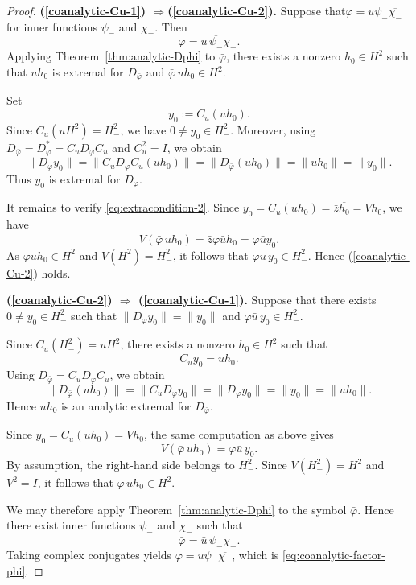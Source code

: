 \documentclass[12pt]{amsart}
\theoremstyle{definition}
\theoremstyle{remark}
\newcommand{\vp}{\varphi}
\numberwithin{equation}{section}
\begin{document}
\begin{proof}
\textbf{\textup{(\ref{coanalytic-Cu-1})}
		$\Rightarrow$\textup{(\ref{coanalytic-Cu-2})}.}
Suppose that$\vp=u\psi_{-}\overline{\chi_{-}}$ for inner functions
$\psi_{-}$ and $\chi_{-}$. Then
\[
\bar{\vp}=\bar{u}\,\overline{\psi_{-}}\chi_{-}.
\]
Applying Theorem~\ref{thm:analytic-Dphi} to $\bar{\vp}$, there exists
a nonzero $h_0\in H^2$ such that $uh_0$ is extremal for $D_{\bar{\vp}}$ and $\bar{\vp}\,uh_0\in H^2$.
	
Set
\[
y_0:=C_u(uh_0).
\]
Since $C_u(uH^2)=H^2_{-}$, we have $0\neq y_0\in H^2_{-}$. Moreover,
using $D_{\bar{\vp}}=D_\vp^*=C_uD_\vp C_u$ and $C_u^2=I$, we obtain
\[
\|D_\vp y_0\|=\|C_uD_\vp C_u(uh_0)\|
	=\|D_{\bar{\vp}}(uh_0)\|=\|uh_0\|=\|y_0\|.
\]
Thus $y_0$ is extremal for $D_\vp$.
	
It remains to verify \eqref{eq:extracondition-2}. Since $y_0=C_u(uh_0)=\bar{z}\overline{h_0}=Vh_0$, we have
\[
V(\bar{\vp}\,uh_0)=\bar{z}\vp\bar{ u}\overline{h_0}
=\vp\bar{ u}y_0.
	\]
As $\bar{\vp}uh_0\in H^2$ and $V(H^2)=H^2_{-}$, it follows that $\vp\bar{u}\,y_0\in H^2_{-}$. Hence \textup{(\ref{coanalytic-Cu-2})} holds.
	
\medskip
	
\textbf{\textup{(\ref{coanalytic-Cu-2})} $\Rightarrow$ \textup{(\ref{coanalytic-Cu-1})}.}
Suppose that there exists $0\neq y_0\in H^2_{-}$ such that $\|D_\vp y_0\|=\|y_0\|$ and $\vp\bar{u}\,y_0\in H^2_{-}$.
	
Since $C_u(H^2_{-})=uH^2$, there exists a nonzero $h_0\in H^2$ such that
\[
C_uy_0=uh_0.
\]
Using $D_{\bar{\vp}}=C_uD_\vp C_u$, we obtain
\[
\|D_{\bar{\vp}}(uh_0)\|=\|C_uD_\vp y_0\|=\|D_\vp y_0\|=\|y_0\|=\|uh_0\|.
	\]
Hence $uh_0$ is an analytic extremal for $D_{\bar{\vp}}$.
	
Since $y_0=C_u(uh_0)=Vh_0$, the same computation as above gives
\[
V(\bar{\vp}\,uh_0)=\vp\bar{u}\,y_0.
\]
By assumption, the right-hand side belongs to $H^2_{-}$. Since
$V(H^2_{-})=H^2$ and $V^2=I$, it follows that $\bar{\vp}\,uh_0\in H^2$.
	
We may therefore apply Theorem~\ref{thm:analytic-Dphi} to the symbol
$\bar{\vp}$. Hence there exist inner functions $\psi_{-}$ and $\chi_{-}$
such that
\[
\bar{\vp}=\bar{u}\,\overline{\psi_{-}}\chi_{-}.
\]
Taking complex conjugates yields $\vp=u\psi_{-}\overline{\chi_{-}}$, which is \eqref{eq:coanalytic-factor-phi}.
\end{proof}
\end{document}
